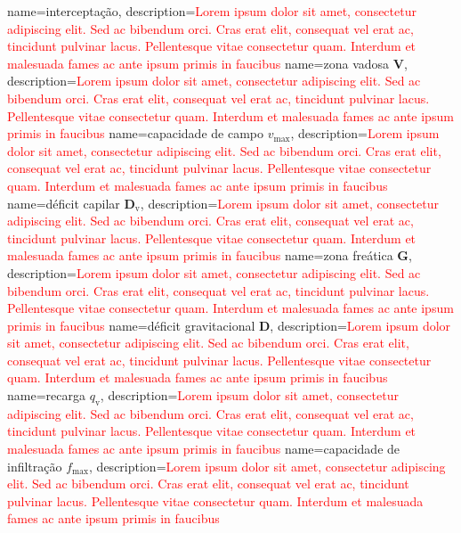 {
    name=interceptação,
    description={\textcolor{red}{Lorem ipsum dolor sit amet, consectetur adipiscing elit. Sed ac bibendum orci. Cras erat elit, consequat vel erat ac, tincidunt pulvinar lacus. Pellentesque vitae consectetur quam. Interdum et malesuada fames ac ante ipsum primis in faucibus}}
}
{
    name=zona vadosa $\textbf{V}$,
    description={\textcolor{red}{Lorem ipsum dolor sit amet, consectetur adipiscing elit. Sed ac bibendum orci. Cras erat elit, consequat vel erat ac, tincidunt pulvinar lacus. Pellentesque vitae consectetur quam. Interdum et malesuada fames ac ante ipsum primis in faucibus}}
}
{
    name=capacidade de campo $v_{\text{max}}$,
    description={\textcolor{red}{Lorem ipsum dolor sit amet, consectetur adipiscing elit. Sed ac bibendum orci. Cras erat elit, consequat vel erat ac, tincidunt pulvinar lacus. Pellentesque vitae consectetur quam. Interdum et malesuada fames ac ante ipsum primis in faucibus}}
}
{
    name=déficit capilar $\textbf{D}_\text{v}$,
    description={\textcolor{red}{Lorem ipsum dolor sit amet, consectetur adipiscing elit. Sed ac bibendum orci. Cras erat elit, consequat vel erat ac, tincidunt pulvinar lacus. Pellentesque vitae consectetur quam. Interdum et malesuada fames ac ante ipsum primis in faucibus}}
}
{
    name=zona freática $\textbf{G}$,
    description={\textcolor{red}{Lorem ipsum dolor sit amet, consectetur adipiscing elit. Sed ac bibendum orci. Cras erat elit, consequat vel erat ac, tincidunt pulvinar lacus. Pellentesque vitae consectetur quam. Interdum et malesuada fames ac ante ipsum primis in faucibus}}
}
{
    name=déficit gravitacional $\textbf{D}$,
    description={\textcolor{red}{Lorem ipsum dolor sit amet, consectetur adipiscing elit. Sed ac bibendum orci. Cras erat elit, consequat vel erat ac, tincidunt pulvinar lacus. Pellentesque vitae consectetur quam. Interdum et malesuada fames ac ante ipsum primis in faucibus}}
}
{
    name=recarga $q_{\text{v}}$,
    description={\textcolor{red}{Lorem ipsum dolor sit amet, consectetur adipiscing elit. Sed ac bibendum orci. Cras erat elit, consequat vel erat ac, tincidunt pulvinar lacus. Pellentesque vitae consectetur quam. Interdum et malesuada fames ac ante ipsum primis in faucibus}}
}
{
    name=capacidade de infiltração $f_{\text{max}}$,
    description={\textcolor{red}{Lorem ipsum dolor sit amet, consectetur adipiscing elit. Sed ac bibendum orci. Cras erat elit, consequat vel erat ac, tincidunt pulvinar lacus. Pellentesque vitae consectetur quam. Interdum et malesuada fames ac ante ipsum primis in faucibus}}
}
